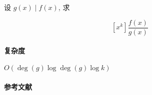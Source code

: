设 \(g(x)\mid f(x)\), 求

\[
    \left[x^k\right]\frac{f(x)}{g(x)}
\]

\paragraph{复杂度}

\(O(\deg(g)\log \deg(g)\log k)\)

\paragraph{参考文献} \cite{bostan2021simple}
